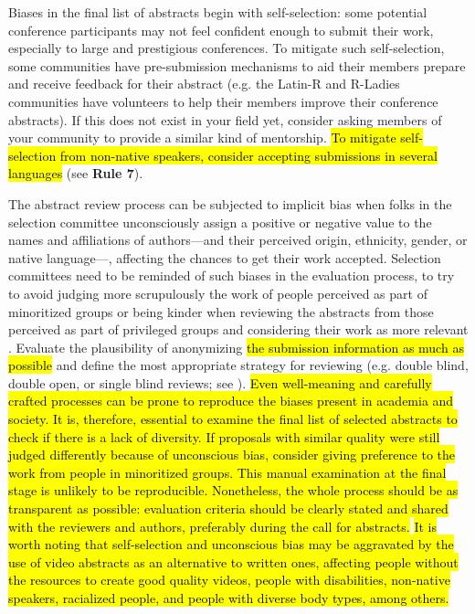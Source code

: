 \documentclass[10pt,letterpaper]{article}
\begin{document}
Biases in the final list of abstracts begin with self-selection: some potential conference participants may not feel confident enough to submit their work, especially to large and prestigious conferences.
To mitigate such self-selection, some communities have pre-submission mechanisms to aid their members prepare and receive feedback for their abstract (e.g. the Latin-R and R-Ladies communities have volunteers to help their members improve their conference abstracts).
If this does not exist in your field yet, consider asking members of your community to provide a similar kind of mentorship.
\hl{To mitigate self-selection from non-native speakers, consider accepting submissions in several languages} (see \textbf{Rule 7}).


The abstract review process can be subjected to implicit bias \cite{ross_everyday_2020} when folks in the selection committee unconsciously assign a positive or negative value to the names and affiliations of authors—and  their perceived origin, ethnicity, gender, or native language—, affecting the chances to get their work accepted.
Selection committees need to be reminded of such biases in the evaluation process, to try to avoid judging more scrupulously the work of people perceived as part of minoritized groups or being kinder when reviewing the abstracts from those perceived as part of privileged groups and considering their work as more relevant \cite{swartzScienceValueDiversity2019, andersson_implicit_2019}.
Evaluate the plausibility of anonymizing \hl{the submission information as much as possible} and
define the most appropriate strategy for reviewing (e.g. double blind, double open, or single blind reviews; see \cite{numfocus_discover_2021}).
 \hl{Even well-meaning and carefully crafted processes can be prone to reproduce the biases present in academia and society. It is, therefore, essential to examine the final list of selected abstracts to check if there is a lack of diversity. If proposals with similar quality were still judged differently because of unconscious bias, consider giving preference to the work from people in minoritized groups.
This manual examination at the final stage is unlikely to be reproducible. Nonetheless, the whole process should be as transparent as possible: evaluation criteria should be clearly stated and shared with the reviewers and authors, preferably during the call for abstracts.} 
\hl{It is worth noting that self-selection and unconscious bias may be aggravated by the use of video abstracts as an alternative to written ones, affecting people without the resources to create good quality videos, people with disabilities, non-native speakers, racialized people, and people with diverse body types, among others.} \cite{spitschanVideoGrantProposals2021}
\end{document}
